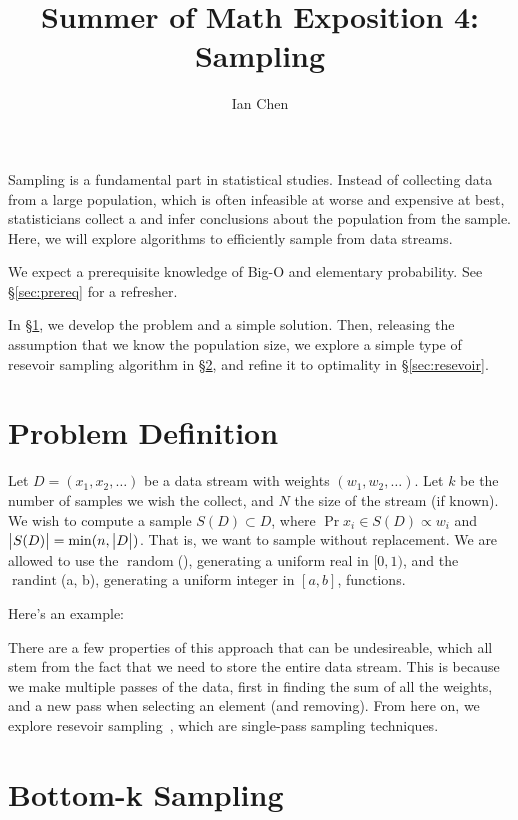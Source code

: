 \documentclass{article}
\title{Summer of Math Exposition 4: Sampling}
\author{Ian Chen}
\newcommand{\random}{\ensuremath{\mathop{random}}}
\newcommand{\randint}{\ensuremath{\mathop{randint}}}
\begin{document}
\maketitle

Sampling is a fundamental part in statistical studies.
Instead of collecting data from a large population, which is often infeasible at worse and expensive at best, statisticians collect a  and infer conclusions about the population from the sample.
Here, we will explore algorithms to efficiently sample from data streams.

We expect a prerequisite knowledge of Big-O and elementary probability.
See \S\ref{sec:prereq} for a refresher.

In \S\ref{sec:problem}, we develop the problem and a simple solution.
Then, releasing the assumption that we know the population size, we explore a simple type of resevoir sampling algorithm in \S\ref{sec:bottomk}, and refine it to optimality in \S\ref{sec:resevoir}.

\section{Problem Definition}
\label{sec:problem}

Let $D = (x_1, x_2, \ldots)$ be a data stream with weights $(w_1, w_2, \ldots)$.
Let $k$ be the number of samples we wish the collect, and $N$ the size of the stream (if known).
We wish to compute a sample $S(D) \subset D$, where $\Pr{x_i \in S(D)} \propto w_i$ and $\left| \bigr. S(D) \right| = \min(n, \left| \bigr. D \right|)$.
That is, we want to sample without replacement.
We are allowed to use the \random(), generating a uniform real in $[0, 1)$, and the \randint(a, b), generating a uniform integer in $[a, b]$, functions.

Here's an example:

There are a few properties of this approach that can be undesireable, which all stem from the fact that we need to store the entire data stream.
This is because we make multiple passes of the data, first in finding the sum of all the weights, and a new pass when selecting an element (and removing).
From here on, we explore resevoir sampling~\cite{vitter85-03}, which are single-pass sampling techniques.

\section{Bottom-k Sampling}
\label{sec:bottomk}
\end{document}

